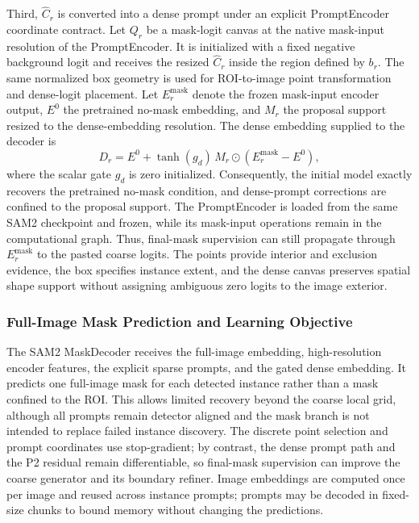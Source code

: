 \documentclass[letterpaper,journal]{IEEEtran}
\begin{document}
Third, $\widehat{C}_r$ is converted into a dense prompt under an explicit PromptEncoder coordinate contract. Let $Q_r$ be a mask-logit canvas at the native mask-input resolution of the PromptEncoder. It is initialized with a fixed negative background logit and receives the resized $\widehat{C}_r$ inside the region defined by $b_r$. The same normalized box geometry is used for ROI-to-image point transformation and dense-logit placement. Let $E_r^{\mathrm{mask}}$ denote the frozen mask-input encoder output, $E^{0}$ the pretrained no-mask embedding, and $M_r$ the proposal support resized to the dense-embedding resolution. The dense embedding supplied to the decoder is
\begin{equation}
D_r=E^{0}+\tanh(g_d)\,M_r\odot\left(E_r^{\mathrm{mask}}-E^{0}\right),
\label{eq:dense_prompt_gate}
\end{equation}
where the scalar gate $g_d$ is zero initialized. Consequently, the initial model exactly recovers the pretrained no-mask condition, and dense-prompt corrections are confined to the proposal support. The PromptEncoder is loaded from the same SAM2 checkpoint and frozen, while its mask-input operations remain in the computational graph. Thus, final-mask supervision can still propagate through $E_r^{\mathrm{mask}}$ to the pasted coarse logits. The points provide interior and exclusion evidence, the box specifies instance extent, and the dense canvas preserves spatial shape support without assigning ambiguous zero logits to the image exterior.

\subsubsection{Full-Image Mask Prediction and Learning Objective}
The SAM2 MaskDecoder receives the full-image embedding, high-resolution encoder features, the explicit sparse prompts, and the gated dense embedding. It predicts one full-image mask for each detected instance rather than a mask confined to the ROI. This allows limited recovery beyond the coarse local grid, although all prompts remain detector aligned and the mask branch is not intended to replace failed instance discovery. The discrete point selection and prompt coordinates use stop-gradient; by contrast, the dense prompt path and the P2 residual remain differentiable, so final-mask supervision can improve the coarse generator and its boundary refiner. Image embeddings are computed once per image and reused across instance prompts; prompts may be decoded in fixed-size chunks to bound memory without changing the predictions.
\end{document}
